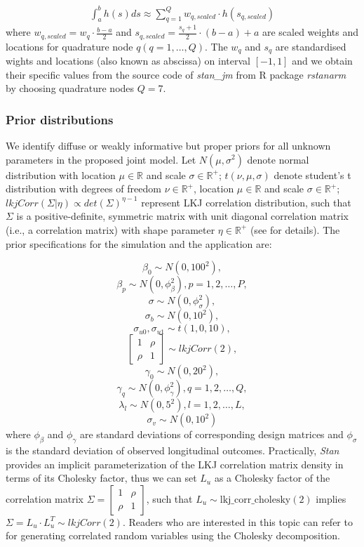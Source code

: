 \begin{align}
  \int_a^b h(s)ds \approx \sum^{Q}_{q=1} w_{q,scaled} \cdot h(s_{q,scaled})  
\end{align}
where $w_{q,scaled}=w_q \cdot \frac{b-a}{2}$ and $s_{q,scaled}=\frac{s_q+1}{2}\cdot(b-a)+a$ are scaled weights and locations for quadrature node $q (q=1,\dots, Q)$. The $w_q$ and $s_q$ are standardised wights and locations (also known as abscissa) on interval $[-1,1]$ and we obtain their specific values from the source code of \emph{stan\_jm} from R package \emph{rstanarm} by choosing quadrature nodes $Q=7$.

\subsubsection{Prior distributions}

We identify diffuse or weakly informative but proper priors for all unknown parameters in the proposed joint model. Let $N(\mu,\sigma^2)$ denote normal distribution with location $\mu \in \mathbb{R}$ and scale $\sigma \in \mathbb{R}^{+}$; $t(\nu,\mu,\sigma)$ denote student's t distribution with degrees of freedom $\nu \in \mathbb{R}^{+}$, location $\mu \in \mathbb{R}$ and scale $\sigma \in \mathbb{R}^{+}$; $lkjCorr(\Sigma|\eta) \propto det(\Sigma)^{\eta-1}$ represent LKJ correlation distribution, such that $\Sigma$ is a positive-definite, symmetric matrix with unit diagonal correlation matrix (i.e., a correlation matrix) with shape parameter $\eta \in \mathbb{R}^+$ (see \cite{Lewandowski2009} for details). The prior specifications for the simulation and the application are:

$$\beta_0 \sim N(0,100^2),$$
$$\beta_p \sim N(0,\phi^2_\beta), p=1,2,\dots,P,$$
$$\sigma \sim N(0,\phi^2_\sigma),$$
$$\sigma_b \sim N(0,10^2),$$
$$\sigma_{u0}, \sigma_{u1} \sim t(1,0,10),$$
$$
\begin{bmatrix}
1 & \rho \\
\rho & 1
\end{bmatrix}  \sim lkjCorr(2), $$
$$\gamma_0 \sim N(0,20^2),$$
$$\gamma_q \sim N(0,\phi^2_\gamma), q=1,2,\dots, Q,$$
$$\lambda_l \sim N(0,5^2), l=1,2,\dots,L,$$
$$\sigma_v \sim N(0,10^2)$$
where $\phi_\beta$ and $\phi_\gamma$ are standard deviations of corresponding design matrices and $\phi_\sigma$ is the standard deviation of observed longitudinal outcomes. Practically, \emph{Stan} provides an implicit parameterization of the LKJ correlation matrix density in terms of its Cholesky factor, thus we can set $L_u$ as a Cholesky factor of the correlation matrix $\Sigma=\begin{bmatrix}
1 & \rho \\
\rho & 1
\end{bmatrix}$, such that $L_u \sim \mbox{lkj\_corr\_cholesky}(2)$ implies $\Sigma = L_u \cdot L^{T}_u \sim lkjCorr(2)$. Readers who are interested in this topic can refer to \cite{Sorensen2016} for generating correlated random variables using the Cholesky decomposition. 

